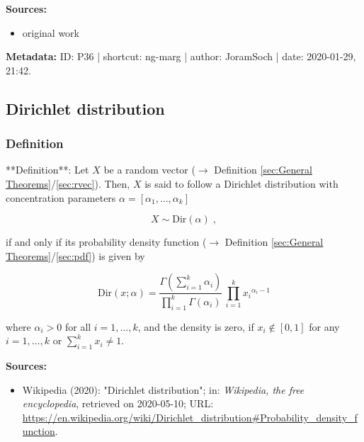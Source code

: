 \documentclass[a4paper,12pt,twoside]{book}
\begin{document}
\vspace{1em}
\textbf{Sources:}
\begin{itemize}
\item original work\end{itemize}


\vspace{1em}
\textbf{Metadata:} ID: P36 | shortcut: ng-marg | author: JoramSoch | date: 2020-01-29, 21:42.
\vspace{1em}



\subsection{Dirichlet distribution}

\subsubsection[\textit{Definition}]{Definition} \label{sec:dir}
\setcounter{equation}{0}

**Definition**: Let $X$ be a random vector ($\rightarrow$ Definition \ref{sec:General Theorems}/\ref{sec:rvec}). Then, $X$ is said to follow a Dirichlet distribution with concentration parameters $\alpha = \left[ \alpha_1, \ldots, \alpha_k \right]$

\begin{equation} \label{eq:dir-Dir}
X \sim \mathrm{Dir}(\alpha) \; ,
\end{equation}

if and only if its probability density function ($\rightarrow$ Definition \ref{sec:General Theorems}/\ref{sec:pdf}) is given by

\begin{equation} \label{eq:dir-beta-pdf}
\mathrm{Dir}(x; \alpha) = \frac{\Gamma\left( \sum_{i=1}^k \alpha_i \right)}{\prod_{i=1}^k \Gamma(\alpha_i)} \, \prod_{i=1}^k {x_i}^{\alpha_i-1}
\end{equation}

where $\alpha_i > 0$ for all $i = 1, \ldots, k$, and the density is zero, if $x_i \notin [0,1]$ for any $i = 1, \ldots, k$ or $\sum_{i=1}^k x_i \neq 1$.


\vspace{1em}
\textbf{Sources:}
\begin{itemize}
\item Wikipedia (2020): "Dirichlet distribution"; in: \textit{Wikipedia, the free encyclopedia}, retrieved on 2020-05-10; URL: \url{https://en.wikipedia.org/wiki/Dirichlet_distribution#Probability_density_function}.
\end{itemize}
\end{document}
